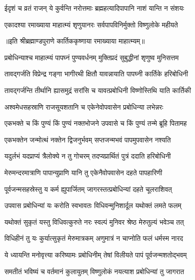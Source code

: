 \twolineshloka
{ईदृशं च व्रतं राजन् ये कुर्वन्ति नरोत्तमाः}
{ब्रह्महत्यादिपापानि नाशं यान्ति न संशयः} %

\twolineshloka
{एकादश्या रमाख्याया माहात्म्यं शृणुयानरः}
{सर्वपापविनिर्मुक्तो विष्णुलोके महीयते} %

॥इति श्रीब्रह्माण्डपुराणे कार्तिककृष्णाया रमाख्याया माहात्म्यम्॥



\twolineshloka
{प्रबोधिन्याश्च माहात्म्यं पापघ्नं पुण्यवर्धनम्}
{मुक्तिप्रदं सुबुद्धीनां शृणुष्व मुनिसत्तम} %

\twolineshloka
{तावद्गर्जति विप्रेन्द्र गङ्गा भागीरथी क्षितौ}
{यावन्नायाति पापघ्नी कार्तिके हरिबोधिनी} %

\twolineshloka
{तावद्गर्जन्ति तीर्थानि ह्यासमुद्रं सरांसि च}
{यावत्प्रबोधिनी विष्णोस्तिथि याति कार्तिकी} %

\twolineshloka
{अश्वमेधसहस्राणि राजसूयशतानि च}
{एकेनेवोपवासेन प्रबोधिन्या लभेन्नरः} %


\twolineshloka
{एकभक्ते च किं पुण्यं किं पुण्यं नक्तभोजने}
{उपवासे च किं पुण्यं तन्मे ब्रूहि पितामह} %


\twolineshloka
{एकभक्तेन जन्मोत्थं नक्तेन द्विजनुर्भवम्}
{सप्तजन्मभवं पापमुपवासेन नश्यति} %

\twolineshloka
{यदुर्लभं यदप्राप्यं त्रैलोक्ये न तु गोचरम्}
{तदप्यप्रार्थितं पुत्रं ददाति हरिबोधिनी} %

\twolineshloka
{मेरुमन्दरमात्राणि पापान्युप्राणि यानि तु}
{एकेनैवोपवासेन दहते पापहारिणी} %

\twolineshloka
{पूर्वजन्मसहस्रेस्तु य कर्म ह्युपार्जितम्}
{जागरस्तत्प्रबोधिन्यां दहते चूलराशिवत्} %

\twolineshloka
{उपवास प्रबोधिन्यां यः करोति स्वभावतः}
{विधिवन्मुनिशार्दूल यथोक्तं लमते फलम्} %

\twolineshloka
{यथोक्तं सुकृतं यस्तु विधिवत्कुरुते नरः}
{स्वल्पं मुनिवर श्रेष्ठ मेरुतुल्यं भवेञ्च तत्} %

\twolineshloka
{विधिहीनं तु यः कुर्यात्सुकृतं मेरुमात्रकम्}
{अणुमात्रं न चाप्नोति फलं धर्मस्म नारद} %

\twolineshloka
{ये ध्यायन्ति मनोवृत्त्या करिष्यामः प्रबोधिनीम्}
{तेषां विलीयते पापं पूर्वजन्मशतोद्भवम्} %

\twolineshloka
{समतीतं भविष्यं च वर्तमानं कुलायुतम्}
{विष्णुलोकं नयत्याश प्रबोधिन्यां तु जागरात} %

